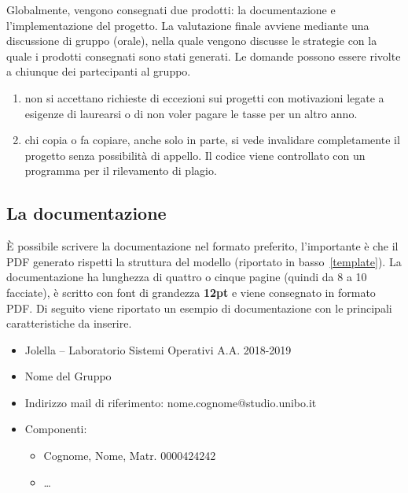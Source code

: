 
Globalmente, vengono consegnati due prodotti: la documentazione e
l'implementazione del progetto. La valutazione finale avviene mediante una
discussione di gruppo (orale), nella quale vengono discusse le strategie con la
quale i prodotti consegnati sono stati generati. Le domande possono essere
rivolte a chiunque dei partecipanti al gruppo.

\begin{tcolorbox}[colback=yellow!20!white,colframe=yellow!75!black,title=\textbf{N.B.}]

 \begin{enumerate}

  \item non si accettano richieste di eccezioni sui progetti
        con motivazioni legate a esigenze di laurearsi o di non voler pagare le tasse
        per un altro anno.

  \item chi copia o fa copiare, anche solo in parte, si vede invalidare
        completamente il progetto senza possibilità di appello. Il codice viene
        controllato con un programma per il rilevamento di plagio.

 \end{enumerate}

\end{tcolorbox}

\subsection{La documentazione}

È possibile scrivere la documentazione nel formato preferito, l'importante è che
il PDF generato rispetti la struttura del modello (riportato in
basso~\ref{template}). La documentazione ha lunghezza di quattro o cinque pagine
(quindi da 8 a 10 facciate), è scritto con font di grandezza \textbf{12pt} e
viene consegnato in formato PDF. Di seguito viene riportato un esempio di
documentazione con le principali caratteristiche da inserire.

\begin{tcolorbox}[colback=green!20!white,colframe=green!75!black,title=L'intestazione della Documentazione]
 \label{template}
 \begin{itemize}
  \item Jolella -- Laboratorio Sistemi Operativi A.A. 2018-2019
  \item Nome del Gruppo
  \item Indirizzo mail di riferimento: nome.cognome@studio.unibo.it
  \item Componenti:
        \begin{itemize}
         \item Cognome, Nome, Matr. 0000424242
         \item \dots
        \end{itemize}
 \end{itemize}
\end{tcolorbox}

